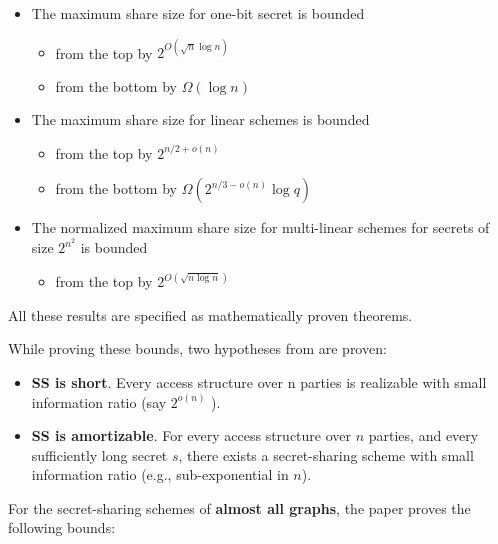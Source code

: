 \begin{itemize}
    \item The maximum share size for one-bit secret is bounded 
    \begin{itemize}
        \item from the top by $2^{O(\sqrt{n}\log n)}$
        \item from the bottom by $\Omega(\log n)$
    \end{itemize}
    \item The maximum share size for linear schemes is bounded
    \begin{itemize}
        \item from the top by $2^{n/2+o(n)}$
        \item from the bottom by $\Omega(2^{n/3-o(n)}\log q)$
    \end{itemize}
    \item The normalized maximum share size for multi-linear schemes for secrets of size $2^{n^2}$ is bounded
    \begin{itemize}
        \item from the top by $2^{O(\sqrt{n \log n})}$
    \end{itemize}
\end{itemize}

All these results are specified as mathematically proven theorems.

While proving these bounds, two hypotheses from \cite{applebaumAmortization} are proven:

\begin{itemize}
    \item \textbf{SS is short}. Every access structure over n parties is realizable with small information ratio (say $2^{o(n)}$ ).
    \item \textbf{SS is amortizable}. For every access structure over $n$ parties, and every sufficiently long secret $s$, 
            there exists a secret-sharing scheme with small information ratio (e.g., sub-exponential in $n$).
\end{itemize}

For the secret-sharing schemes of \textbf{almost all graphs}, the paper proves the following bounds:


